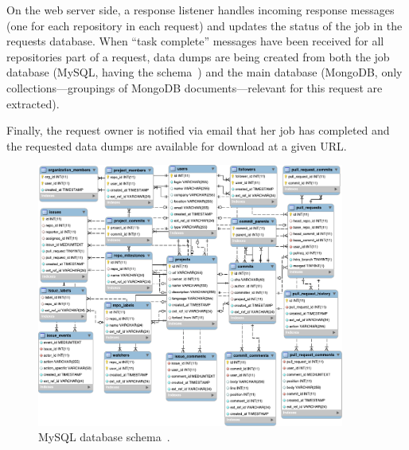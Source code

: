 On the web server side, a response listener handles incoming response messages (one for each repository
in each request)  and updates the status of the job in the requests database.
When ``task complete'' messages have been received for all repositories part of a request, data dumps
are being created from both the job database (MySQL, having the \ght schema~\cite{gousios2013ghtorent})
and the main \ght database (MongoDB, only collections---groupings of MongoDB documents---relevant for this
request are extracted).

Finally, the request owner is notified via email that her job has completed and the requested data dumps
are available for download at a given URL.

\begin{figure}[t]
\begin{center}
\includegraphics[width=0.9\textwidth]{figures/schema.pdf}
\caption{MySQL database schema~\cite{gousios2013ghtorent}.}
\label{fig:schema}
\end{center}
\end{figure}

